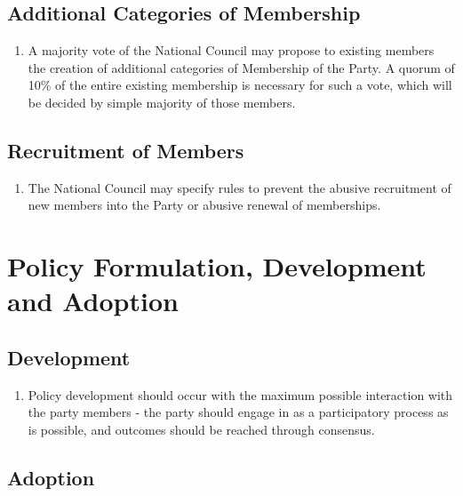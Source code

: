 \documentclass[a4paper,titlepage,8.5pt]{article}
\begin{document}
\subsection{Additional Categories of Membership} 

\begin{enumerate}
\item A majority vote of the National Council may propose to existing members the creation of additional categories of Membership of the Party. A quorum of 10\% of the entire existing membership is necessary for such a vote, which will be decided by simple majority of those members. 
\end{enumerate}

\subsection{Recruitment of Members}

\begin{enumerate}
\item The National Council may specify rules to prevent the abusive recruitment of new members into the Party or abusive renewal of memberships. 
\end{enumerate}

\section{Policy Formulation, Development and Adoption}

\subsection{Development}

\begin{enumerate}
\item Policy development should occur with the maximum possible interaction with the party members - the party should engage in as a participatory process as is possible, and outcomes should be reached through consensus.
\end{enumerate}

\subsection{Adoption}
\end{document}
